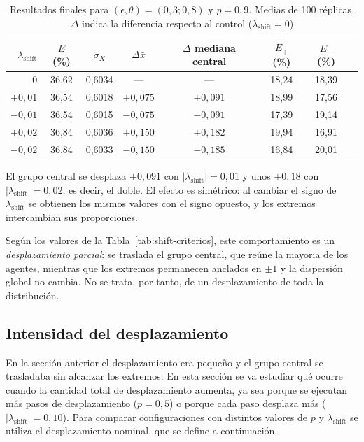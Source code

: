 \documentclass[11pt,a4paper]{article}
\begin{document}
\begin{table}[htbp]
\centering
\caption{Resultados finales para $(\epsilon,\theta)=(0{,}3;0{,}8)$ y $p=0{,}9$. Medias de 100 réplicas. $\Delta$ indica la diferencia respecto al control ($\lambda_{\mathrm{shift}}=0$)}
\label{tab:shift-intermedio}
\begin{tabular}{rccccccc}
\toprule
$\lambda_{\mathrm{shift}}$ & $E$ (\%) & $\sigma_X$ & $\Delta\bar{x}$ & $\Delta$ mediana central & $E_{+}$ (\%) & $E_{-}$ (\%) \\
\midrule
$0$       & 36,62 & 0,6034 & ---     & ---     & 18,24 & 18,39      \\
$+0{,}01$ & 36,54 & 0,6018 & $+0{,}075$ & $+0{,}091$ & 18,99 & 17,56  \\
$-0{,}01$ & 36,54 & 0,6015 & $-0{,}075$ & $-0{,}091$ & 17,39 & 19,14 \\
$+0{,}02$ & 36,84 & 0,6036 & $+0{,}150$ & $+0{,}182$ & 19,94 & 16,91  \\
$-0{,}02$ & 36,84 & 0,6033 & $-0{,}150$ & $-0{,}185$ & 16,84 & 20,01  \\
\bottomrule
\end{tabular}
\end{table}

El grupo central se desplaza $\pm0{,}091$ con $|\lambda_{\mathrm{shift}}|=0{,}01$ y unos $\pm0{,}18$ con $|\lambda_{\mathrm{shift}}|=0{,}02$, es decir, el doble. El efecto es simétrico: al cambiar el signo de $\lambda_{\mathrm{shift}}$ se obtienen los mismos valores con el signo opuesto, y los extremos intercambian sus proporciones.

Según los valores de la Tabla~\ref{tab:shift-criterios}, este comportamiento es un \emph{desplazamiento parcial}: se traslada el grupo central, que reúne la mayoria de los agentes, mientras que los extremos permanecen anclados en $\pm1$ y la dispersión global no cambia. No se trata, por tanto, de un desplazamiento de toda la distribución.


\subsection{Intensidad del desplazamiento}
\label{sec:shift-intensidad}

En la sección anterior el desplazamiento era pequeño y el grupo central se trasladaba sin alcanzar los extremos. En esta sección se va estudiar qué ocurre cuando la cantidad total de desplazamiento aumenta, ya sea porque se ejecutan más pasos de desplazamiento ($p=0{,}5$) o porque cada paso desplaza más ($|\lambda_{\mathrm{shift}}|=0{,}10$). Para comparar configuraciones con distintos valores de $p$ y $\lambda_{\mathrm{shift}}$ se utiliza el desplazamiento nominal, que se define a continuación.
\end{document}
